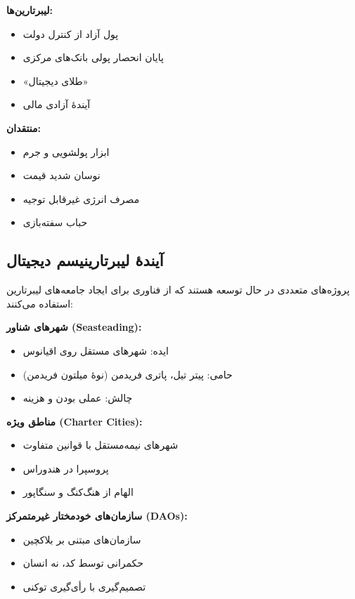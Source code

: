 \begin{tcolorbox}[
    enhanced,
    colback=violet!8,
    colframe=violet,
    boxrule=1.5pt,
    arc=5pt,
    fonttitle=\bfseries,
    title={\rl{🟣 دیدگاه‌های مختلف دربارهٔ بیت‌کوین}}
]

\textbf{لیبرتارین‌ها:}
\begin{itemize}
    \item پول آزاد از کنترل دولت
    \item پایان انحصار پولی بانک‌های مرکزی
    \item «طلای دیجیتال»
    \item آیندهٔ آزادی مالی
\end{itemize}



\textbf{منتقدان:}
\begin{itemize}
    \item ابزار پولشویی و جرم
    \item نوسان شدید قیمت
    \item مصرف انرژی غیرقابل توجیه
    \item حباب سفته‌بازی
\end{itemize}
\end{tcolorbox}

\subsection{آیندهٔ لیبرتارینیسم دیجیتال}


پروژه‌های متعددی در حال توسعه هستند که از فناوری برای ایجاد جامعه‌های لیبرتارین استفاده می‌کنند:

\textbf{شهرهای شناور (Seasteading):}
\begin{itemize}
    \item ایده: شهرهای مستقل روی اقیانوس
    \item حامی: پیتر تیل، پاتری فریدمن (نوهٔ میلتون فریدمن)
    \item چالش: عملی بودن و هزینه
\end{itemize}

\textbf{مناطق ویژه (Charter Cities):}
\begin{itemize}
    \item شهرهای نیمه‌مستقل با قوانین متفاوت
    \item پروسپرا در هندوراس
    \item الهام از هنگ‌کنگ و سنگاپور
\end{itemize}

\textbf{سازمان‌های خودمختار غیرمتمرکز (DAOs):}
\begin{itemize}
    \item سازمان‌های مبتنی بر بلاکچین
    \item حکمرانی توسط کد، نه انسان
    \item تصمیم‌گیری با رأی‌گیری توکنی
\end{itemize}

